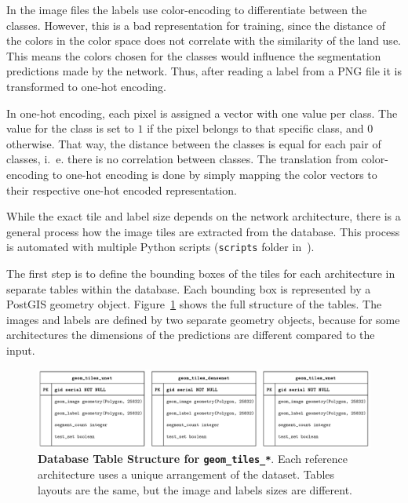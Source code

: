 In the image files the labels use color-encoding to differentiate between the classes. However, this is a bad representation for training, since the distance of the colors in the color space does not correlate with the similarity of the land use. This means the colors chosen for the classes would influence the segmentation predictions made by the network. Thus, after reading a label from a PNG file it is transformed to one-hot encoding.

In one-hot encoding, each pixel is assigned a vector with one value per class. The value for the class is set to $1$ if the pixel belongs to that specific class, and $0$ otherwise. That way, the distance between the classes is equal for each pair of classes, i.~e. there is no correlation between classes. The translation from color-encoding to one-hot encoding is done by simply mapping the color vectors to their respective one-hot encoded representation.

While the exact tile and label size depends on the network architecture, there is a general process how the image tiles are extracted from the database. This process is automated with multiple Python scripts (\texttt{scripts} folder in~\cite{thesis-code20}).

The first step is to define the bounding boxes of the tiles for each architecture in separate tables within the database. Each bounding box is represented by a  PostGIS geometry object. Figure~\ref{fig:geom_tiles_entities} shows the full structure of the tables. The images and labels are defined by two separate geometry objects, because for some architectures the dimensions of the predictions are different compared to the input.

\begin{figure}[h]
    \centering
    \includegraphics[width=\textwidth]{images/geom_tiles_entities}
    \caption[Database Table Structure for \texttt{geom\_tiles\_*}]
    {\textbf{Database Table Structure for \texttt{geom\_tiles\_*}}. Each reference architecture uses a unique arrangement of the dataset. Tables layouts are the same, but the image and labels sizes are different.}
    \label{fig:geom_tiles_entities}
\end{figure}

